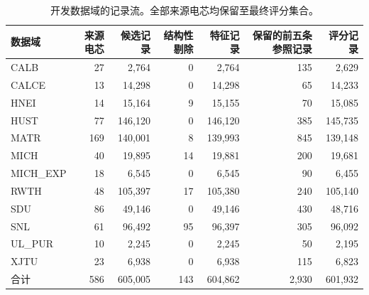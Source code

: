 \documentclass[UTF8,11pt]{ctexart}
\begin{document}
\begin{landscape}
\begin{table}[H]
\centering
\caption{开发数据域的记录流。全部来源电芯均保留至最终评分集合。}
\label{tab:development_flow_zh}
\scriptsize
\setlength{\tabcolsep}{5.2pt}
\renewcommand{\arraystretch}{1.05}
\begin{tabular}{@{}lrrrrrr@{}}
\toprule
数据域 & 来源电芯 & 候选记录 & 结构性剔除 & 特征记录 & 保留的前五条参照记录 & 评分记录 \\
\midrule
CALB & 27 & 2,764 & 0 & 2,764 & 135 & 2,629 \\
CALCE & 13 & 14,298 & 0 & 14,298 & 65 & 14,233 \\
HNEI & 14 & 15,164 & 9 & 15,155 & 70 & 15,085 \\
HUST & 77 & 146,120 & 0 & 146,120 & 385 & 145,735 \\
MATR & 169 & 140,001 & 8 & 139,993 & 845 & 139,148 \\
MICH & 40 & 19,895 & 14 & 19,881 & 200 & 19,681 \\
MICH\_EXP & 18 & 6,545 & 0 & 6,545 & 90 & 6,455 \\
RWTH & 48 & 105,397 & 17 & 105,380 & 240 & 105,140 \\
SDU & 86 & 49,146 & 0 & 49,146 & 430 & 48,716 \\
SNL & 61 & 96,492 & 95 & 96,397 & 305 & 96,092 \\
UL\_PUR & 10 & 2,245 & 0 & 2,245 & 50 & 2,195 \\
XJTU & 23 & 6,938 & 0 & 6,938 & 115 & 6,823 \\
\midrule
合计 & 586 & 605,005 & 143 & 604,862 & 2,930 & 601,932 \\
\bottomrule
\end{tabular}
\end{table}


\end{landscape}
\end{document}
